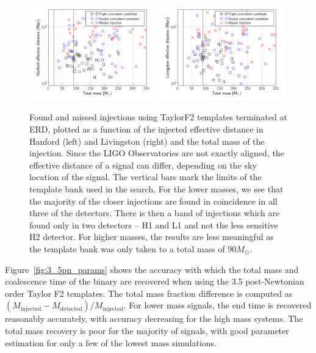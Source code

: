 \begin{figure}
\begin{center}
  \includegraphics[width=0.49\textwidth]{figures/ninja1/spa_erd_3_5pn_found_missed_mchirp}
  \includegraphics[width=0.49\textwidth]{figures/ninja1/spa_erd_3_5pn_found_missed_mchirp_l}
\end{center}
\caption[NINJA1 injections found/missed by an inspiral search with
$f_c=$ ERD.]{
\label{fig:3_5pn_found_missed}
Found and missed injections using TaylorF2 templates
terminated at ERD, plotted as a function of the injected effective
distance in Hanford (left) and Livingston (right) and the total mass
of the injection. Since the LIGO Observatories are not exactly
aligned, the effective distance of a signal can differ, depending on
the sky location of the signal.  The vertical bars mark the limits of
the template bank used in the search.  For the lower masses, we see
that the majority of the closer injections are found in coincidence in
all three of the detectors.  There is then a band of injections which
are found only in two detectors -- H1 and L1 and not the less
sensitive H2 detector.  For higher masses, the results are less
meaningful as the template bank was only taken to a total mass of $90
M_{\odot}$.}
\end{figure}

Figure~\ref{fig:3_5pn_params} shows the accuracy with which the total mass and
coalescence time of the binary are recovered when using the 3.5 post-Newtonian
order Taylor F2 templates. The total mass fraction difference is computed as
$(M_\mathrm{injected} - M_\mathrm{detected})/ M_\mathrm{injected}$. For lower
mass signals, the end time is recovered reasonably accurately, with accuracy
decreasing for the high mass systems. The total mass recovery is poor for the
majority of signals, with good parameter estimation for only a few of the
lowest mass simulations.

